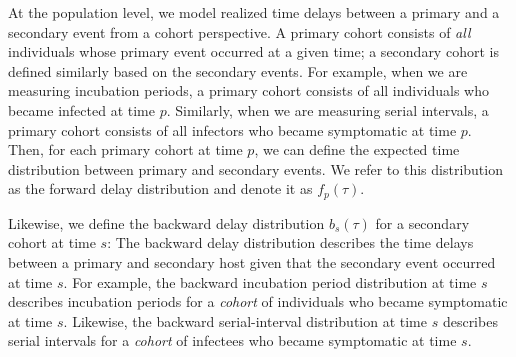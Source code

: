 \documentclass[12pt]{article}
\newcommand{\psymp}{\ensuremath{p}} %
\newcommand{\ssymp}{\ensuremath{s}} %
\begin{document}
At the population level, we model realized time delays between a primary and a secondary event from a cohort perspective.
A primary cohort consists of \emph{all} individuals whose primary event occurred at a given time; 
a secondary cohort is defined similarly based on the secondary events.
For example, when we are measuring incubation periods, a primary cohort consists of all individuals who became infected at time $\psymp$.
Similarly, when we are measuring serial intervals, a primary cohort consists of all infectors who became symptomatic at time $\psymp$.
Then, for each primary cohort at time $\psymp$, we can define the expected time distribution between primary and secondary events.
We refer to this distribution as the forward delay distribution and denote it as $f_\psymp(\tau)$.

Likewise, we define the backward delay distribution $b_\ssymp(\tau)$ for a secondary cohort at time $\ssymp$:
The backward delay distribution describes the time delays between a primary and secondary host given that the secondary event occurred at time $\ssymp$.
For example, the backward incubation period distribution at time $\ssymp$ describes incubation periods for a \emph{cohort} of individuals who became symptomatic at time $\ssymp$.
Likewise, the backward serial-interval distribution at time $\ssymp$ describes serial intervals for a \emph{cohort} of infectees who became symptomatic at time $\ssymp$.
\end{document}
